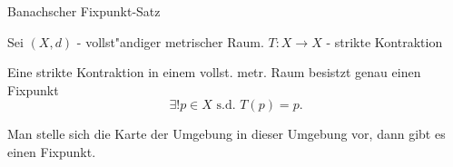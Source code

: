 \documentclass[class=article, crop=false]{standalone}
\begin{document}
\begin{zettel}{Banachscher Fixpunkt-Satz}
\begin{flashcard}[]{}
	Sei $ (X,d) $  - vollst"andiger metrischer Raum. $T: X \longrightarrow X$ - strikte Kontraktion

	\begin{theorem}
		Eine strikte Kontraktion in einem vollst. metr. Raum besistzt genau einen Fixpunkt
		\[
			\exists ! p \in  X \text{ s.d. } T(p)  = p
		.\]
	\end{theorem}
\end{flashcard}
\begin{example}[Fixpunkt]
	Man stelle sich die Karte der Umgebung in dieser Umgebung vor, dann gibt es einen Fixpunkt.
\end{example}
\end{zettel}
\end{document}
